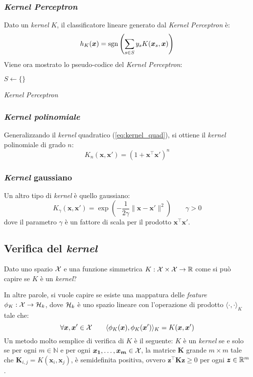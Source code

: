 \subsubsection{\textit{Kernel Perceptron}}
Dato un \textit{kernel} $K$, il classificatore lineare generato dal
\textit{Kernel Perceptron} è:
$$ h_K(\bm{x}) 
= \operatorname*{sgn}{\left(\sum_{s\in S} y_sK(\bm{x}_s,\bm{x})\right)} $$
Viene ora mostrato lo pseudo-codice del \textit{Kernel Perceptron}:
\begin{algorithm}
    \DontPrintSemicolon
    $S\leftarrow\{\}$\;
    \caption{\textit{Kernel Perceptron}}
\end{algorithm}
\vspace{-1.5em}

\subsubsection{\textit{Kernel polinomiale}}
Generalizzando il \textit{kernel} quadratico (\ref{eq:kernel_quad}), si
ottiene il \textit{kernel} polinomiale di grado $n$:
$$ K_n(\bm{x},\bm{x}') = (1+\bm{x}^\top\bm{x}')^n $$

\subsubsection{\textit{Kernel} gaussiano}
Un altro tipo di \textit{kernel} è quello gaussiano:
$$ K_\gamma(\bm{x},\bm{x}') =  \exp\left(
    -\frac{1}{2\gamma}\|\bm{x}-\bm{x}'\|^2
\right) \qquad \gamma>0 $$
dove il parametro $\gamma$ è un fattore di scala per il prodotto
$\bm{x}^\top\bm{x}'$.

\subsection{Verifica del \textit{kernel}}
Dato uno spazio $\mathcal{X}$ e una funzione simmetrica $K:\mathcal{X}\times\mathcal{X}\rightarrow\mathbb{R}$
come si può capire se $K$ è un \textit{kernel}?

In altre parole, si vuole capire se esiste una mappatura delle
\textit{feature} $\phi_K:\mathcal{X}\rightarrow\mathcal{H}_k$, dove $\mathcal{H}_k$ è uno
spazio lineare con l'operazione di prodotto $\langle\cdot,\cdot\rangle_K$
tale che:
$$ \forall\bm{x},\bm{x}'\in\mathcal{X} \qquad
 \langle\phi_K(\bm{x}),\phi_K(\bm{x}')\rangle_K = K(\bm{x},\bm{x}')$$
Un metodo molto semplice di verifica di $K$ è il seguente: $K$ è un 
\textit{kernel} se e solo se per ogni $m\in\mathbb{N}$ e per ogni
$\bm{x_1},\dots,\bm{x_m}\in\mathcal{X}$, la matrice $\bm{K}$ grande $m\times m$
tale che $\bm{K}_{i,j}=K(\bm{x}_i,\bm{x}_j)$, è semidefinita positiva,
ovvero $\bm{z}^\top\bm{Kz}\geq 0$ per ogni $\bm{z}\in\mathbb{R}^m$.


